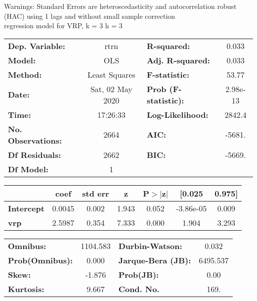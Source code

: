 Warnings: \newline
 [1] Standard Errors are heteroscedasticity and autocorrelation robust (HAC) using 1 lags and without small sample correction\\ 

regression model for VRP, k = 3 h = 3\begin{center}
\begin{tabular}{lclc}
\toprule
\textbf{Dep. Variable:}    &       rtrn       & \textbf{  R-squared:         } &     0.033   \\
\textbf{Model:}            &       OLS        & \textbf{  Adj. R-squared:    } &     0.033   \\
\textbf{Method:}           &  Least Squares   & \textbf{  F-statistic:       } &     53.77   \\
\textbf{Date:}             & Sat, 02 May 2020 & \textbf{  Prob (F-statistic):} &  2.98e-13   \\
\textbf{Time:}             &     17:26:33     & \textbf{  Log-Likelihood:    } &    2842.4   \\
\textbf{No. Observations:} &        2664      & \textbf{  AIC:               } &    -5681.   \\
\textbf{Df Residuals:}     &        2662      & \textbf{  BIC:               } &    -5669.   \\
\textbf{Df Model:}         &           1      & \textbf{                     } &             \\
\bottomrule
\end{tabular}
\begin{tabular}{lcccccc}
                   & \textbf{coef} & \textbf{std err} & \textbf{z} & \textbf{P$> |$z$|$} & \textbf{[0.025} & \textbf{0.975]}  \\
\midrule
\textbf{Intercept} &       0.0045  &        0.002     &     1.943  &         0.052        &    -3.86e-05    &        0.009     \\
\textbf{vrp}       &       2.5987  &        0.354     &     7.333  &         0.000        &        1.904    &        3.293     \\
\bottomrule
\end{tabular}
\begin{tabular}{lclc}
\textbf{Omnibus:}       & 1104.583 & \textbf{  Durbin-Watson:     } &    0.032  \\
\textbf{Prob(Omnibus):} &   0.000  & \textbf{  Jarque-Bera (JB):  } & 6495.537  \\
\textbf{Skew:}          &  -1.876  & \textbf{  Prob(JB):          } &     0.00  \\
\textbf{Kurtosis:}      &   9.667  & \textbf{  Cond. No.          } &     169.  \\
\bottomrule
\end{tabular}
\end{center}

